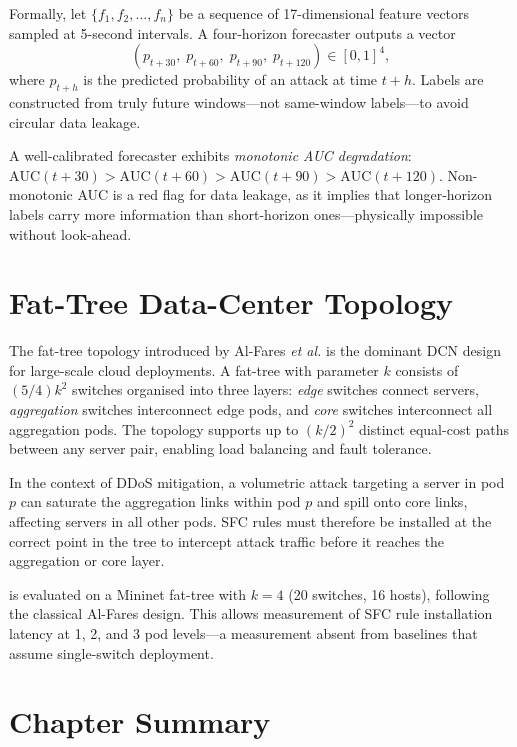 Formally, let $\{f_1, f_2, \ldots, f_n\}$ be a sequence of
17-dimensional feature vectors sampled at 5-second intervals. A
four-horizon forecaster outputs a vector
\[
  (p_{t+30},\; p_{t+60},\; p_{t+90},\; p_{t+120}) \in [0,1]^4,
\]
where $p_{t+h}$ is the predicted probability of an attack at time
$t + h$. Labels are constructed from truly future windows---not
same-window labels---to avoid circular data leakage.

A well-calibrated forecaster exhibits \emph{monotonic AUC degradation}:
$\text{AUC}(t{+}30) > \text{AUC}(t{+}60) > \text{AUC}(t{+}90) >
\text{AUC}(t{+}120)$. Non-monotonic AUC is a red flag for data leakage,
as it implies that longer-horizon labels carry more information than
short-horizon ones---physically impossible without look-ahead.

\section{Fat-Tree Data-Center Topology}
\label{sec:fttopo}

The fat-tree topology introduced by Al-Fares \textit{et al.} is the
dominant DCN design for large-scale cloud deployments. A fat-tree with
parameter $k$ consists of $(5/4)k^2$ switches organised into three
layers: \emph{edge} switches connect servers, \emph{aggregation} switches
interconnect edge pods, and \emph{core} switches interconnect all
aggregation pods. The topology supports up to $(k/2)^2$ distinct equal-cost
paths between any server pair, enabling load balancing and fault tolerance.

In the context of DDoS mitigation, a volumetric attack targeting a server
in pod $p$ can saturate the aggregation links within pod $p$ and spill
onto core links, affecting servers in all other pods. SFC rules must
therefore be installed at the correct point in the tree to intercept
attack traffic before it reaches the aggregation or core layer.

\padonap{} is evaluated on a Mininet fat-tree with $k{=}4$ (20 switches,
16 hosts), following the classical Al-Fares design. This allows
measurement of SFC rule installation latency at 1, 2, and 3 pod levels---a
measurement absent from baselines that assume single-switch deployment.

\section{Chapter Summary}
\label{sec:bg-summary}

